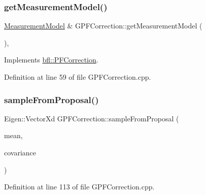 \subsubsection{\texorpdfstring{get\+Measurement\+Model()}{getMeasurementModel()}}
{\footnotesize\ttfamily \mbox{\hyperlink{classbfl_1_1MeasurementModel}{Measurement\+Model}} \& G\+P\+F\+Correction\+::get\+Measurement\+Model (\begin{DoxyParamCaption}{ }\end{DoxyParamCaption})\hspace{0.3cm}{\ttfamily [override]}, {\ttfamily [virtual]}}



Implements \mbox{\hyperlink{classbfl_1_1PFCorrection_a891c7d498caffb4d11e5ebdaa475c683}{bfl\+::\+P\+F\+Correction}}.



Definition at line 59 of file G\+P\+F\+Correction.\+cpp.

\mbox{\label{classbfl_1_1GPFCorrection_a6f8f793f647296a407fbeefbac781908}} 
\subsubsection{\texorpdfstring{sample\+From\+Proposal()}{sampleFromProposal()}}
{\footnotesize\ttfamily Eigen\+::\+Vector\+Xd G\+P\+F\+Correction\+::sample\+From\+Proposal (\begin{DoxyParamCaption}\item[{const Eigen\+::\+Vector\+Xd \&}]{mean,  }\item[{const Eigen\+::\+Matrix\+Xd \&}]{covariance }\end{DoxyParamCaption})\hspace{0.3cm}{\ttfamily [protected]}}



Definition at line 113 of file G\+P\+F\+Correction.\+cpp.

\mbox{\label{classbfl_1_1PFCorrection_aa84e757c694d4ad375cdd543d42ac34c}} 
